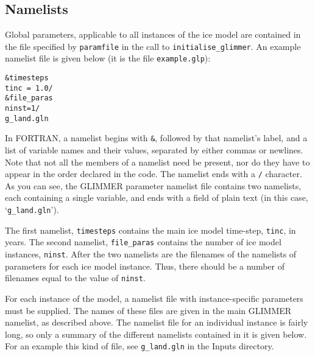 \documentclass[11pt]{article}
\begin{document}
\subsection{Namelists}
%
Global parameters, applicable to all instances of the ice model are contained
in the file specified by \texttt{paramfile} in the call to
\texttt{initialise\_glimmer}. An example namelist file is given below (it is
the file \texttt{example.glp}):
%
\begin{verbatim}
&timesteps
tinc = 1.0/
&file_paras
ninst=1/
g_land.gln
\end{verbatim}
%
In FORTRAN, a namelist begins with \texttt{\&}, followed by that namelist's
label, and a list of variable names and their values, separated by either
commas or newlines. Note that not all the members of a namelist need be
present, nor do they have to appear in the order declared in the code. 
The namelist ends with a \texttt{/} character. As you can see, the GLIMMER
parameter namelist file contains two namelists, each containing a single
variable, and ends with a field of plain text (in this case, `\texttt{g\_land.gln}').

The first namelist, \texttt{timesteps} contains the main ice model time-step,
\texttt{tinc}, in years. The second namelist, \texttt{file\_paras} contains
the number of ice model instances, \texttt{ninst}. After the two namelists are
the filenames of the namelists of parameters for each ice model
instance. Thus, there should be a number of filenames equal to the value of \texttt{ninst}.

For each instance of the model, a namelist file with instance-specific
parameters must be supplied. The names of these files are given in the main
GLIMMER namelist, as described above. The namelist file for an individual
instance is fairly long, so only a summary of the different namelists
contained in it is given below. For an example this kind of file, see
\texttt{g\_land.gln} in the Inputs directory.
\end{document}

